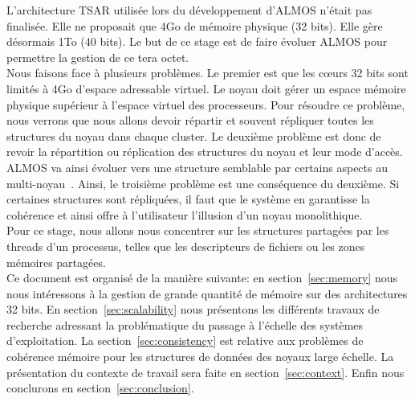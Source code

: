  L'architecture TSAR utilisée lors du développement d'ALMOS n'était pas
  finalisée. Elle ne proposait que 4Go de mémoire physique (32 bits). Elle gère
  désormais 1To (40 bits). Le but de ce stage est de faire évoluer ALMOS pour
  permettre la gestion de ce tera octet.\\

  Nous faisons face à plusieurs problèmes. Le premier est que les c\oe urs 32
  bits sont limités à 4Go d'espace adressable virtuel. Le noyau doit gérer un
  espace mémoire physique supérieur à l'espace virtuel des processeurs. Pour
  résoudre ce problème, nous verrons que nous allons devoir répartir et souvent
  répliquer toutes les structures du noyau dans chaque cluster.  Le deuxième
  problème est donc de revoir la répartition ou réplication des structures du
  noyau et leur mode d'accès. ALMOS va ainsi évoluer vers une structure
  semblable par certains aspects au
  multi-noyau~\citep{baumann2009multikernel}. Ainsi, le troisième problème est
  une conséquence du deuxième. Si certaines structures sont répliquées, il faut
  que le système en garantisse la cohérence et ainsi offre à l'utilisateur
  l'illusion d'un noyau monolithique. \\

  Pour ce stage, nous allons nous concentrer sur les structures partagées par
  les threads d'un processus, telles que les descripteurs de fichiers ou les
  zones mémoires partagées. \\

  Ce document est organisé de la manière suivante: en section~\ref{sec:memory}
  nous nous intéressons à la gestion de grande quantité de mémoire sur des
  architectures 32 bits. En section~\ref{sec:scalability} nous présentons les
  différents travaux de recherche adressant la problématique du passage à
  l'échelle des systèmes d'exploitation.  La section~\ref{sec:consistency} est
  relative aux problèmes de cohérence mémoire pour les structures de données des
  noyaux large échelle. La présentation du contexte de travail sera faite en
  section~\ref{sec:context}. Enfin nous conclurons en
  section~\ref{sec:conclusion}.\newline
